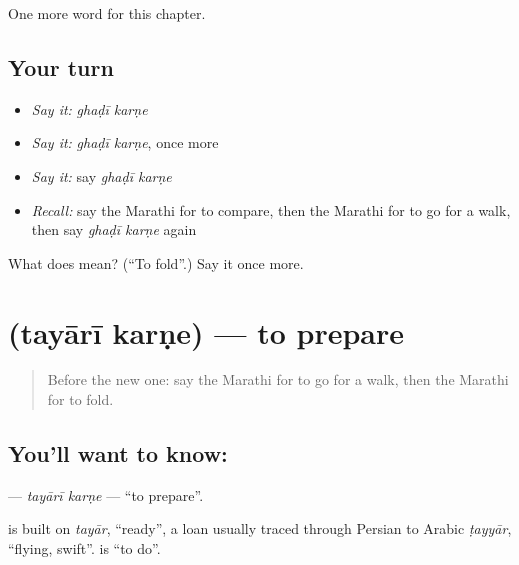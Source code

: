\begin{grammarlens}[title={What you've built}]
One more word for this chapter.
\end{grammarlens}

\subsection*{Your turn}
\begin{itemize}
\raggedright
  \item \emph{Say it:} \emph{ghaḍī karṇe}
  \item \emph{Say it:} \emph{ghaḍī karṇe}, once more
  \item \emph{Say it:} say \emph{ghaḍī karṇe}
  \item \emph{Recall:} say the Marathi for to compare, then the Marathi for to go for a walk, then say \emph{ghaḍī karṇe} again
\end{itemize}

\begin{tcolorbox}[breakable,colback=teal!4,colframe=teal!35!black,title={Before you move on}]
What does   mean? (\textquotedblleft{}To fold\textquotedblright{}.) Say it once more.
\end{tcolorbox}
\section[\texorpdfstring{\mr{तयारी} \mr{करणे} (tayārī karṇe)}{तयारी करणे (tayārī karṇe)}]{  (tayārī karṇe) — to prepare}

\label{lesson:MR-C196-tayari-karne}



\begin{quote}
Before the new one: say the Marathi for to go for a walk, then the Marathi for to fold.
\end{quote}

\subsection*{You'll want to know:  }
\textbf{ } — \emph{tayārī karṇe} — \textquotedblleft{}to prepare\textquotedblright{}.

\begin{cousinweb}
\textbf{} is built on \emph{tayār}, \textquotedblleft{}ready\textquotedblright{}, a loan usually traced through Persian to Arabic \emph{ṭayyār}, \textquotedblleft{}flying, swift\textquotedblright{}. \textbf{} is \textquotedblleft{}to do\textquotedblright{}.
\end{cousinweb}

